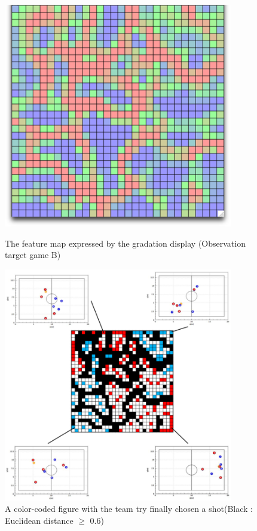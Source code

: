 \begin{figure}[ht]
  \begin{center}
  
    \includegraphics[clip,width=10.0cm]{figure/The_feature_map_expressed_by_the_gradation_display_Observation_target_game_B.eps}
    \caption{The feature map expressed by the gradation display
(Observation target game B)}
    \label{fig:SOM_result09}
    
    \includegraphics[width=10.0cm]{figure/A_color-coded_figure_with_the_team_try_finally_chosen_shot_Black_Euclidean_distance_more_than_0.6.eps}
    \caption{A color-coded figure with the team try finally chosen a shot(Black : Euclidean distance $\geq$ 0.6)}
    \label{fig:SOM_result10}
    
  \end{center}
\end{figure}

